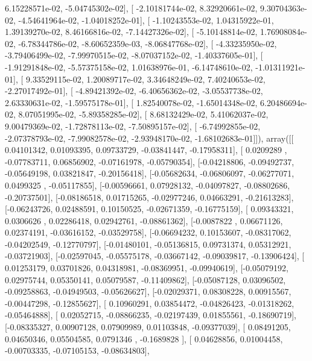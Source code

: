 \documentclass{article}
\begin{document}
          6.15228571e-02,  -5.04745302e-02],
       [ -2.10181744e-02,   8.32920661e-02,   9.30704363e-02,
         -4.54641964e-02,  -1.04018252e-01],
       [ -1.10243553e-02,   1.04315922e-01,   1.39139270e-02,
          8.46166816e-02,  -7.14427326e-02],
       [ -5.10148814e-02,   1.76908084e-02,  -6.78344786e-02,
         -8.60652359e-03,  -8.06847768e-02],
       [ -4.33235950e-02,  -3.79406499e-02,  -7.99970515e-02,
         -8.07037152e-02,  -1.40337605e-01],
       [ -1.91291848e-02,  -5.57375158e-02,   1.01638976e-01,
         -6.14748610e-02,  -1.01311921e-01],
       [  9.33529115e-02,   1.20089717e-02,   3.34648249e-02,
          7.40240653e-02,  -2.27017492e-01],
       [ -4.89421392e-02,  -6.40656362e-02,  -3.05537738e-02,
          2.63330631e-02,  -1.59575178e-01],
       [  1.82540078e-02,  -1.65014348e-02,   6.20486694e-02,
          8.07051995e-02,  -5.89358285e-02],
       [  8.68132429e-02,   5.41062037e-02,   9.00479369e-02,
         -1.72878113e-02,  -7.50895157e-02],
       [ -6.74992855e-02,  -2.07378793e-02,  -7.99082578e-02,
         -2.93948170e-02,  -1.68102683e-01]]), array([[ 0.04101342,  0.01093395,  0.09733729, -0.03841447, -0.17958311],
       [ 0.0209289 , -0.07783711,  0.06856902, -0.07161978, -0.05790354],
       [-0.04218806, -0.09492737, -0.05649198,  0.03821847, -0.20156418],
       [-0.05682634, -0.06806097, -0.06277071,  0.0499325 , -0.05117855],
       [-0.00596661,  0.07928132, -0.04097827, -0.08802686, -0.20737501],
       [-0.08186518,  0.01715265, -0.02977246,  0.04663291, -0.21613283],
       [-0.06243726,  0.02488591,  0.10150525, -0.02671359, -0.16775159],
       [ 0.09343321,  0.0306626 ,  0.02286418,  0.02942761, -0.08861362],
       [-0.0087822 ,  0.06671126,  0.02374191, -0.03616152, -0.03529758],
       [-0.06694232,  0.10153607, -0.08317062, -0.04202549, -0.12770797],
       [-0.01480101, -0.05136815,  0.09731374,  0.05312921, -0.03721903],
       [-0.02597045, -0.05575178, -0.03667142, -0.09039817, -0.13906424],
       [ 0.01253179,  0.03701826,  0.04318981, -0.08369951, -0.09940619],
       [-0.05079192,  0.02975744,  0.05350141,  0.05079587, -0.11409862],
       [-0.05087128,  0.03096502, -0.09258863, -0.04949503, -0.05626627],
       [-0.02029371,  0.08308228,  0.00915567, -0.00447298, -0.12855627],
       [ 0.10960291,  0.03854472, -0.04826423, -0.01318262, -0.05464888],
       [ 0.02052715, -0.08866235, -0.02197439,  0.01855561, -0.18690719],
       [-0.08335327,  0.00907128,  0.07909989,  0.01103848, -0.09377039],
       [ 0.08491205,  0.04650346,  0.05504585,  0.0791346 , -0.1689828 ],
       [ 0.04628856,  0.01004458, -0.00703335, -0.07105153, -0.08634803],
\end{document}
